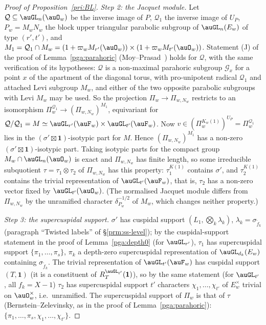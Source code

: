 \documentclass[10pt]{amsart}
\theoremstyle{definition}
\theoremstyle{remark}
\begin{document}
\begin{proof}[Proof of Proposition~\ref{pri:BL}]
\emph{Step 2: the Jacquet module.} Let $\mathcal Q\subseteq\auGL_n(\auO_w)$ be the inverse image of
$P$, $\mathcal Q_1$ the inverse image of $U_P$, $P_w=M_wN_w$ the block upper triangular parabolic
subgroup of $\auGL_n(E_w)$ of type $(r',t')$, and $M_1=\mathcal Q_1\cap M_w=(1+\varpi_wM_{r'}(\auO_w))
\times(1+\varpi_wM_{t'}(\auO_w))$. Statement (J) of the proof of Lemma~\ref{pga:parahoric}
(Moy--Prasad~\cite[Proposition~6.7]{MoyPrasad}) holds for $\mathcal Q$, with the same verification of
its hypotheses: $\mathcal Q$ is a non-maximal parahoric subgroup $\mathcal G_x$ for a point $x$ of
the apartment of the diagonal torus, with pro-unipotent radical $\mathcal Q_1$ and attached Levi
subgroup $M_w$, and either of the two opposite parabolic subgroups with Levi $M_w$ may be used. So
the projection $\Pi_w\to\Pi_{w,N_w}$ restricts to an isomorphism $\Pi_w^{\mathcal Q_1}\to(\Pi_{w,N_w})^{
M_1}$, equivariant for $\mathcal Q/\mathcal Q_1=M\simeq\auGL_{r'}(\auF_w)\times\auGL_{t'}(\auF_w)$. Now
$v\in(\Pi_w^{K_w(1)})^{U_P}=\Pi_w^{\mathcal Q_1}$ lies in the $(\sigma'\boxtimes\mathbf 1)$-isotypic part
for $M$. Hence $(\Pi_{w,N_w})^{M_1}$ has a non-zero $(\sigma'\boxtimes\mathbf 1)$-isotypic part. Taking
isotypic parts for the compact group $M_w\cap\auGL_n(\auO_w)$ is exact and $\Pi_{w,N_w}$ has finite
length, so some irreducible subquotient $\tau=\tau_1\otimes\tau_2$ of $\Pi_{w,N_w}$ has this property:
$\tau_1^{K(1)}$ contains $\sigma'$, and $\tau_2^{K(1)}$ contains the trivial representation of
$\auGL_{t'}(\auF_w)$, that is, $\tau_2$ has a non-zero vector fixed by $\auGL_{t'}(\auO_w)$. (The
normalised Jacquet module differs from $\Pi_{w,N_w}$ by the unramified character
$\delta_{P_w}^{-1/2}$ of $M_w$, which changes neither property.)

\emph{Step 3: the supercuspidal support.} $\sigma'$ has cuspidal support $(L_1,\bigotimes_k\lambda_k)$,
$\lambda_k=\sigma_{\tilde f_k}$ (paragraph ``Twisted labels'' of \S\ref{prm:ss-level}); by the
cuspidal-support statement in the proof of Lemma~\ref{pga:depth0} (for $\auGL_{r'}$), $\tau_1$ has
supercuspidal support $\{\pi_1,\dots,\pi_s\}$, $\pi_k$ a depth-zero supercuspidal representation of
$\auGL_{d_k}(E_w)$ containing $\sigma_{\tilde f_k}$. The trivial representation of $\auGL_{t'}(\auF_w)$
has cuspidal support $(T,\mathbf 1)$ (it is a constituent of $R_T^{\auGL_{t'}}(\mathbf 1)$), so by the
same statement (for $\auGL_{t'}$, all $f_k=X-1$) $\tau_2$ has supercuspidal support $t'$ characters
$\chi_1,\dots,\chi_{t'}$ of $E_w^\times$ trivial on $\auO_w^\times$, i.e.\ unramified. The supercuspidal
support of $\Pi_w$ is that of $\tau$ (Bernstein--Zelevinsky, as in the proof of
Lemma~\ref{pga:parahoric}): $\{\pi_1,\dots,\pi_s,\chi_1,\dots,\chi_{t'}\}$.


\end{proof}
\end{document}
